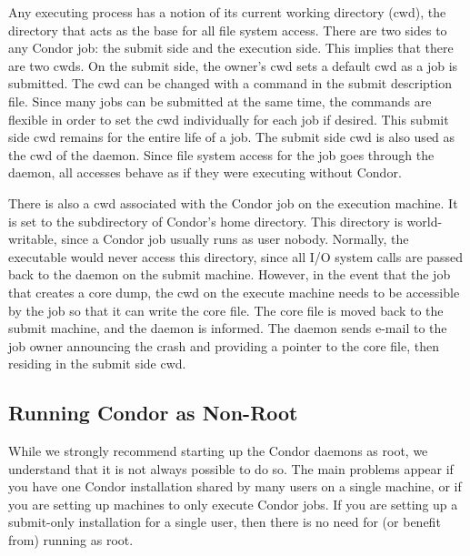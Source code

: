 Any executing process has a notion of its current working
directory (cwd),
the directory that acts as the base for all file system access.
There are two sides to any Condor job:
the submit side and the execution side.
This implies that there are two cwds.
On the submit side, the owner's cwd sets
a default cwd as a job is submitted.
The cwd can be changed with a command in the submit description file.
Since many jobs can be submitted at the same time,
the commands are flexible in order to set the cwd individually for
each job if desired.
This submit side cwd remains for the entire life of a job.
The submit side cwd is also used as the cwd of the  daemon.
Since file system access for the job goes through the 
daemon,
all accesses behave as if they were executing without Condor.

There is also a cwd associated with the Condor job on the execution machine.
It is set to the  subdirectory of Condor's home directory.
This directory is world-writable, since a Condor job usually runs as user
nobody.
Normally, the executable would never access this directory,
since all I/O system calls are passed back to the  daemon
on the submit machine.
However, in the event that the job that creates a core dump,
the cwd on the execute machine needs to be accessible by
the job so that it can write the core file.
The core file is moved back to the submit machine,
and the  daemon is informed.
The  daemon sends e-mail to the job owner announcing the
crash and providing a pointer to the core file, then residing
in the submit side cwd.


\subsection{\label{sec:Non-Root}Running Condor as Non-Root}

While we strongly recommend starting up the Condor daemons as root, we
understand that it is not always possible to do so.
The main problems appear
if you have one Condor installation shared by many users
on a single machine, or if you are setting up machines to only
execute Condor jobs.
If you are setting up a submit-only installation for
a single user, then there is no need for (or benefit from) running as
root.  

